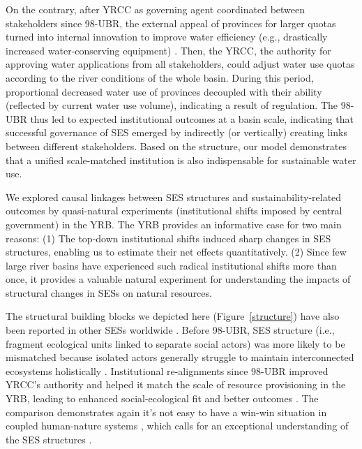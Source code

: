 \label{discussion-3}
On the contrary, after YRCC as governing agent coordinated between stakeholders since 98-UBR, the external appeal of provinces for larger quotas turned into internal innovation to improve water efficiency (e.g., drastically increased water-conserving equipment)
\cite{krieger1955, ostrom1990}.
Then, the YRCC, the authority for approving water applications from all stakeholders, could adjust water use quotas according to the river conditions of the whole basin.
During this period, proportional decreased water use of provinces decoupled with their ability (reflected by current water use volume), indicating a result of regulation.
The 98-UBR thus led to expected institutional outcomes at a basin scale, indicating that successful governance of SES emerged by indirectly (or vertically) creating links between different stakeholders.
Based on the structure, our model demonstrates that a unified scale-matched institution is also indispensable for sustainable water use.

We explored causal linkages between SES structures and sustainability-related outcomes by quasi-natural experiments (institutional shifts imposed by central government) in the YRB.
The YRB provides an informative case for two main reasons:
(1) The top-down institutional shifts induced sharp changes in SES structures, enabling us to estimate their net effects quantitatively.
(2) Since few large river basins have experienced such radical institutional shifts more than once, it provides a valuable natural experiment for understanding the impacts of structural changes in SESs on natural resources.

The structural building blocks we depicted here (Figure~\ref{structure}) have also been reported in other SESs worldwide \cite{kluger2020,guerrero2015,bodin2012}.
Before 98-UBR, SES structure (i.e., fragment ecological units linked to separate social actors) was more likely to be mismatched because isolated actors generally struggle to maintain interconnected ecosystems holistically \cite{sayles2017,sayles2019,cai2016,bergsten2019}.
Institutional re-alignments since 98-UBR improved YRCC's authority and helped it match the scale of resource provisioning in the YRB, leading to enhanced social-ecological fit and better outcomes \cite{cumming2020a,wang2019d}.
The comparison demonstrates again it's not easy to have a win-win situation in coupled human-nature systems \cite{hegwood2022}, which calls for an exceptional understanding of the SES structures \cite{bergsten2019, sayles2019}.

